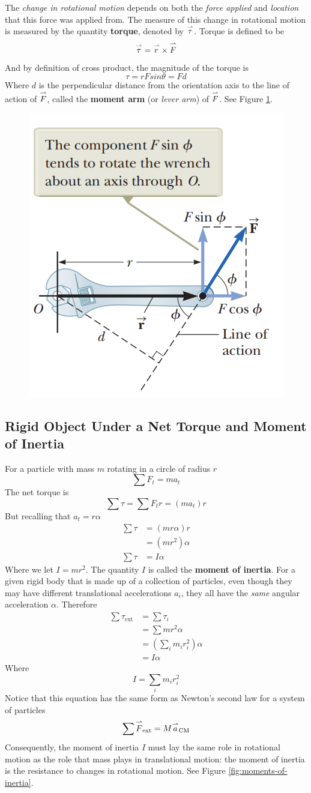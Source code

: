 The \textit{change in rotational motion} depends on both the \textit{force applied} and 
\textit{location} that this force was applied from. The measure of this change in rotational motion
is measured by the quantity \textbf{torque}, denoted by $\overset{\rightharpoonup}{\tau}$. Torque is defined to be
\[
    \overset{\rightharpoonup}{\tau}=\overset{\rightharpoonup}{r}\times\overset{\rightharpoonup}{F}
\]
And by definition of cross product, the magnitude of the torque is
\[
    \tau=rFsin\theta=Fd
\]
Where $d$ is the perpendicular distance from the orientation axis to the line of action of 
$\overset{\rightharpoonup}{F}$, called the \textbf{moment arm} (or \textit{lever arm}) of $\overset{\rightharpoonup}{F}$. See Figure 
\ref{fig:torque}.

\begin{figure}[ht!]
    \centering
    \includegraphics[width=0.4 \textwidth]{../figures/torque.png}
    \caption{}
    \label{fig:torque}
\end{figure}

\subsection{Rigid Object Under a Net Torque and Moment of Inertia}
For a particle with mass $m$ rotating in a circle of radius $r$
\[
    \sum F_t=ma_t
\]
The net torque is
\[
    \sum\tau=\sum F_tr=(ma_t)r
\]
But recalling that $a_t=r\alpha$
\begin{align*}
    \sum\tau&=(mr\alpha)r\\
    &=(mr^2)\alpha\\
    \sum\tau&=I\alpha
\end{align*}
Where we let $I=mr^2$. The quantity $I$ is called the \textbf{moment of inertia}. For a given rigid
body that is made up of a collection of particles, even though they may have different translational
accelerations $a_i$, they all have the \textit{same} angular acceleration $\alpha$. Therefore
\begin{align*}
    \sum \tau_\text{ext}&=\sum\tau_i\\
    &=\sum mr^2\alpha\\
    &=(\sum_im_ir_i^2)\alpha\\
    &=I\alpha
\end{align*}
Where
\[
    I=\sum_im_ir_i^2
\]
Notice that this equation has the same form as Newton's second law for a system of particles
\[
    \sum\overset{\rightharpoonup}{F}_\text{ext}=M\overset{\rightharpoonup}{a}_\text{CM}
\]
Consequently, the moment of inertia $I$ must lay the same role in rotational motion as the role
that mass plays in translational motion: the moment of inertia is the resistance to changes in
rotational motion. See Figure \ref{fig:moments-of-inertia}.

